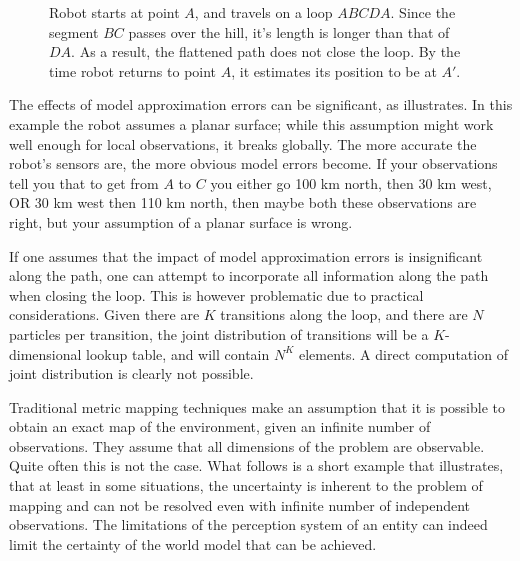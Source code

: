 \begin{figure}[htbp]
  \centering

\caption[Effect of unmodelled environment features on localisation]
{Robot starts at point $A$, and travels on a loop
$ABCDA$. Since the segment $BC$ passes over the hill, it's length
is longer than that of $DA$. As a result, the flattened path does not
close the loop. By the time robot returns to point $A$, it
estimates its position to be at $A'$.}
  \label{fig:hump}
\end{figure}


The effects of model approximation errors can be significant, as
 illustrates. In this example the robot assumes a
planar surface; while this assumption might work well enough for local
observations, it breaks globally. The more accurate the robot's
sensors are, the more obvious model errors become. If your
observations tell you that to get from $A$ to $C$ you either go 100 km
north, then 30 km west, OR 30 km west then 110 km north, then maybe
both these observations are right, but your assumption of a planar
surface is wrong.

If one assumes that the impact of model approximation errors is
insignificant along the path, one can attempt to incorporate all
information along the path when closing the loop. This is however
problematic due to practical considerations. Given there are $K$
transitions along the loop, and there are $N$ particles per
transition, the joint distribution of transitions will be a
$K$-dimensional lookup table, and will contain $N^K$ elements. A
direct computation of joint distribution is clearly not possible.

Traditional metric mapping techniques make an assumption that it is
possible to obtain an exact map of the environment, given an infinite
number of observations. They assume that all dimensions of the problem
are observable. Quite often this is not the case. What follows is a
short example that illustrates, that at least in some situations, the
uncertainty is inherent to the problem of mapping and can not be
resolved even with infinite number of independent observations. The
limitations of the perception system of an entity can indeed limit the
certainty of the world model that can be achieved.



